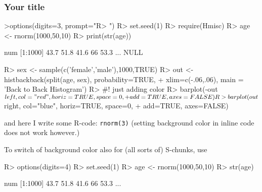 \documentclass[9pt]{beamer}
\newenvironment{Schunk}{}{}
\let\code\lstinline
\begin{document}
\begin{frame}
\frametitle{Your title}


\begin{Schunk}
\begin{Sinput}
>options(digits=3, prompt="R> ")
R> set.seed(1)
R> require(Hmisc)
R> age <- rnorm(1000,50,10)
R> print(str(age))
\end{Sinput}
\begin{Soutput}
 num [1:1000] 43.7 51.8 41.6 66 53.3 ...
NULL
\end{Soutput}
\begin{Sinput}
R> sex <- sample(c('female','male'),1000,TRUE)
R> out <- histbackback(split(age, sex), probability=TRUE,
+           xlim=c(-.06,.06), main = 'Back to Back Histogram')
R> #! just adding color
R> barplot(-out$left, col="red" , horiz=TRUE, space=0,
+         add=TRUE, axes=FALSE)
R> barplot(out$right, col="blue", horiz=TRUE, space=0,
+         add=TRUE, axes=FALSE)
\end{Sinput}
\end{Schunk}


and here I write some  {\sf R}-code: \code{rnorm(3)}
(setting background color in inline code does not work however.)

\framebreak
To switch of background color also for (all sorts of) S-chunks, use

%
%
%
%
%

\begin{Schunk}
\begin{Sinput}
R> options(digits=4)
R> set.seed(1)
R> age <- rnorm(1000,50,10)
R> str(age)
\end{Sinput}
\begin{Soutput}
 num [1:1000] 43.7 51.8 41.6 66 53.3 ...
\end{Soutput}
\end{Schunk}

\end{frame}
\end{document}
